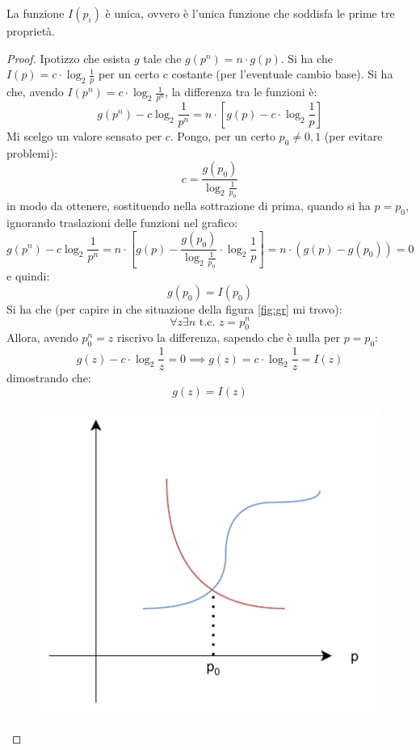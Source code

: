 \documentclass[a4paper,12pt, oneside]{book}
\begin{document}
\begin{teorema}
  La funzione $I(p_i)$ è unica, ovvero è l'unica funzione che soddisfa le prime
  tre proprietà. 
\end{teorema}
\begin{proof}
  Ipotizzo che esista $g$ tale che $g(p^n)=n\cdot g(p)$. Si ha che $I(p)=c\cdot
  \log_2\frac{1}{p}$ per un certo $c$ costante (per l'eventuale cambio base). Si
  ha che, avendo $I(p^n)=c\cdot \log_2\frac{1}{p^n}$, la differenza tra le
  funzioni è:
  \[g(p^n)-c\log_2\frac{1}{p^n}=n\cdot\left[g(p)-c\cdot \log_2
      \frac{1}{p}\right]\] 
  Mi scelgo un valore sensato per $c$. Pongo, per un certo $p_0\neq 0,1$ (per
  evitare problemi):
  \[c=\frac{g(p_0)}{\log_2\frac{1}{p_0}}\]
  in modo da ottenere, sostituendo nella sottrazione di prima, quando si ha
  $p=p_0$, ignorando traslazioni delle funzioni nel grafico:
  \[g(p^n)-c\log_2\frac{1}{p^n}=n\cdot\left[g(p)-\frac{g(p_0)}{
        \log_2\frac{1}{p_0}}\cdot 
      \log_2 \frac{1}{p}\right]=n\cdot (g(p)-g(p_0))=0\]  
  e quindi:
  \[g(p_0)=I(p_0)\]
  Si ha che (per capire in che situazione della figura \ref{fig:gr} mi trovo):
  \[\forall z\exists n\mbox{ t.c. }z=p_0^n\]
  Allora, avendo $p_0^n=z$ riscrivo la differenza, sapendo che è nulla per
  $p=p_0$: 
  \[g(z)-c\cdot \log_2\frac{1}{z}=0\implies g(z)=c\cdot\log_2\frac{1}{z}=I(z)\]
  dimostrando che:
  \[g(z)=I(z)\]
  \begin{figure}[H]
    \centering
    \includegraphics[scale = 0.6]{img/grap2.pdf}

\end{figure}
\end{proof}
\end{document}
